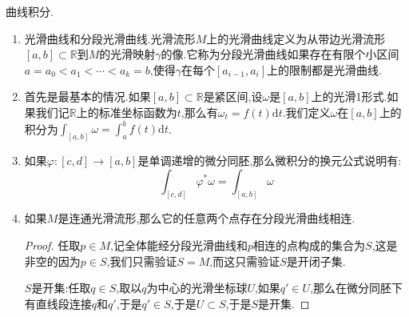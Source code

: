曲线积分.
\begin{enumerate}
	\item 光滑曲线和分段光滑曲线.光滑流形$M$上的光滑曲线定义为从带边光滑流形$[a,b]\subset\mathbb{R}$到$M$的光滑映射$\gamma$的像.它称为分段光滑曲线如果存在有限个小区间$a=a_0<a_1<\cdots<a_k=b$,使得$\gamma$在每个$[a_{i-1},a_i]$上的限制都是光滑曲线.
	\item 首先是最基本的情况.如果$[a,b]\subset\mathbb{R}$是紧区间,设$\omega$是$[a,b]$上的光滑1形式.如果我们记$\mathbb{R}$上的标准坐标函数为$t$,那么有$\omega_t=f(t)\mathrm{d}t$.我们定义$\omega$在$[a,b]$上的积分为$\int_{[a,b]}\omega=\int_a^bf(t)\mathrm{d}t$.
	\item 如果$\varphi:[c,d]\to[a,b]$是单调递增的微分同胚,那么微积分的换元公式说明有:
	$$\int_{[c,d]}\varphi^*\omega=\int_{[a,b]}\omega$$
	\item 如果$M$是连通光滑流形,那么它的任意两个点存在分段光滑曲线相连.
	\begin{proof}
		
		任取$p\in M$,记全体能经分段光滑曲线和$p$相连的点构成的集合为$S$,这是非空的因为$p\in S$,我们只需验证$S=M$,而这只需验证$S$是开闭子集.
		
		$S$是开集:任取$q\in S$,取以$q$为中心的光滑坐标球$U$,如果$q'\in U$,那么在微分同胚下有直线段连接$q$和$q'$,于是$q'\in S$,于是$U\subset S$,于是$S$是开集.
		

\end{proof}
\end{enumerate}
